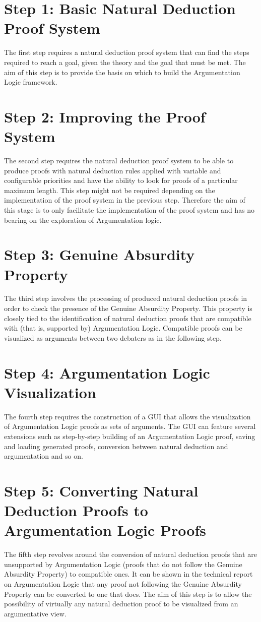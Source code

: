 \documentclass[11pt,twoside,a4paper]{report}
\begin{document}
\section{Step 1: Basic Natural Deduction Proof System}
The first step requires a natural deduction proof system that can find the steps required to reach a goal, given the theory and the goal that must be met. The aim of this step is to provide the basis on which to build the Argumentation Logic framework.

\section{Step 2: Improving the Proof System}
The second step requires the natural deduction proof system to be able to produce proofs with natural deduction rules applied with variable and configurable priorities and have the ability to look for proofs of a particular maximum length. This step might not be required depending on the implementation of the proof system in the previous step. Therefore the aim of this stage is to only facilitate the implementation of the proof system and has no bearing on the exploration of Argumentation logic.

\section{Step 3: Genuine Absurdity Property}
The third step involves the processing of produced natural deduction proofs in order to check the presence of the Genuine Absurdity Property. This property is closely tied to the identification of natural deduction proofs that are compatible with (that is, supported by) Argumentation Logic. Compatible proofs can be visualized as arguments between two debaters as in the following step.

\section{Step 4: Argumentation Logic Visualization}
The fourth step requires the construction of a GUI that allows the visualization of Argumentation Logic proofs as sets of arguments. The GUI can feature several extensions such as step-by-step building of an Argumentation Logic proof, saving and loading generated proofs, conversion between natural deduction and argumentation and so on.

\section{Step 5: Converting Natural Deduction Proofs to Argumentation Logic Proofs}
The fifth step revolves around the conversion of natural deduction proofs that are unsupported by Argumentation Logic (proofs that do not follow the Genuine Absurdity Property) to compatible ones. It can be shown in the technical report on Argumentation Logic that any proof not following the Genuine Absurdity Property can be converted to one that does. The aim of this step is to allow the possibility of virtually any natural deduction proof to be visualized from an argumentative view.
\end{document}
